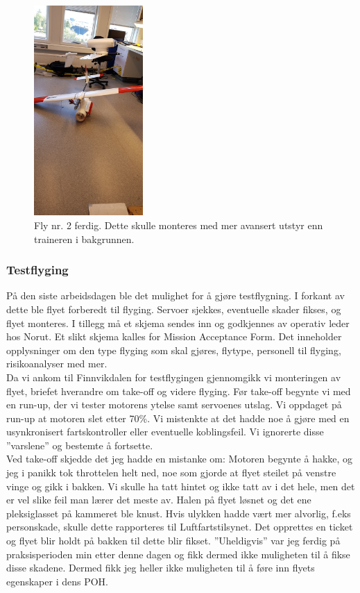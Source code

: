 \documentclass[12pt, a4paper]{report}
\begin{document}
\begin{figure}[h]
	\centering
	\includegraphics[width = .6\textwidth, height = 8cm]{bilder/andre_fly_ferdigstilt.jpg}
	\caption{Fly nr. 2 ferdig. Dette skulle monteres med mer avansert utstyr enn traineren i bakgrunnen.}
\end{figure}

\subsubsection{Testflyging}
På den siste arbeidsdagen ble det mulighet for å gjøre testflygning. I forkant av dette ble flyet forberedt til flyging. Servoer sjekkes, eventuelle skader fikses, og flyet monteres. I tillegg må et skjema sendes inn og godkjennes av operativ leder hos Norut. Et slikt skjema kalles for Mission Acceptance Form. Det inneholder opplysninger om den type flyging som skal gjøres, flytype, personell til flyging, risikoanalyser med mer. \\
Da vi ankom til Finnvikdalen for testflygingen gjennomgikk vi monteringen av flyet, briefet hverandre om take-off og videre flyging. Før take-off begynte vi med en run-up, der vi tester motorens ytelse samt servoenes utslag. Vi oppdaget på run-up at motoren slet etter 
70\%. Vi mistenkte at det hadde noe å gjøre med en usynkronisert fartskontroller eller eventuelle koblingsfeil. Vi ignorerte disse ''varslene'' og bestemte å fortsette. \\
Ved take-off skjedde det jeg hadde en mistanke om: Motoren begynte å hakke, og jeg i panikk tok throttelen helt ned, noe som gjorde at flyet steilet på venstre vinge og gikk i bakken. Vi skulle ha tatt hintet og ikke tatt av i det hele, men det er vel slike feil man lærer det meste av. Halen på flyet løsnet og det ene pleksiglasset på kammeret ble knust. 
Hvis ulykken hadde vært mer alvorlig, f.eks personskade, skulle dette rapporteres til Luftfartstilsynet. Det opprettes en ticket og flyet blir holdt på bakken til dette blir fikset. ''Uheldigvis'' var jeg ferdig på praksisperioden min etter denne dagen og fikk dermed ikke muligheten til å fikse disse skadene. Dermed fikk jeg heller ikke muligheten til å føre inn flyets egenskaper i dens POH. 
\end{document}
